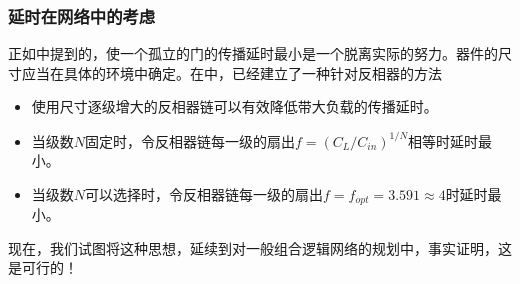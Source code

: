 


\subsubsection{延时在网络中的考虑}
正如中提到的，使一个孤立的门的传播延时最小是一个脱离实际的努力。器件的尺寸应当在具体的环境中确定。在中，已经建立了一种针对反相器的方法
\begin{itemize}
    \item 使用尺寸逐级增大的反相器链可以有效降低带大负载的传播延时。
    \item 当级数$N$固定时，令反相器链每一级的扇出$f=(C_{L}/C_{in})^{1/N}$相等时延时最小。
    \item 当级数$N$可以选择时，令反相器链每一级的扇出$f=f_{opt}=3.591\approx 4$时延时最小。
\end{itemize}
现在，我们试图将这种思想，延续到对一般组合逻辑网络的规划中，事实证明，这是可行的！

